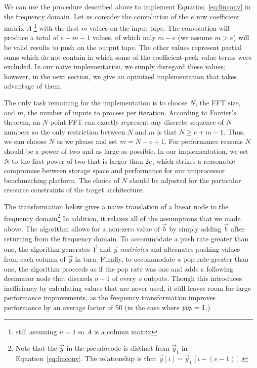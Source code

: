 We can use the procedure described above to implement
Equation~\ref{eq:linconv} in the frequency domain.  Let us consider
the convolution of the $e$ row coefficient matrix $A$
\footnote{still assuming $u=1$ so $A$ is a column matrix} with the
first $m$ values on the input tape. The convolution will produce 
a total of $e+m-1$ values, of which only $m-e$ (we assume $m>e$) 
will be valid results to push on the output tape.
The other values represent partial sums which do not contain
in which some of the coefficient-peek value terms were excluded.
In our naive implementation, we simply disregard these values; 
however, in the next section, we give an optmized implementation 
that takes advantage of them.

The only task remaining for the implementation is to choose $N$, 
the FFT size, and $m$, the number of inputs to process per iteration.
According to Fourier's theorem, an $N$-point FFT can exactly represent 
any discrete sequence of $N$ numbers so the only restriction between $N$ and
$m$ is that $N\ge e+m-1$.
Thus, we can choose $N$ as we please and set $m = N-e+1$.  
For performance reasons $N$ should be a power of two and as large as possible.  
In our implementation, we set $N$ to the first power of two that is 
larger than $2e$, which strikes a reasonable compromise between storage 
space and performance for our uniprocessor benchmarking platform. 
The choice of $N$ should be adjusted for the particular resource 
constraints of the target architecture.

The transformation below gives a naive translation of a linear node to
the frequency domain\footnote{Note that the $\vec{y}$ in the
pseudocode is distinct from $\vec{y}_1$ in Equation~\ref{eq:linconv}.
The relationship is that $\vec{y}[i] = \vec{y}_1\hspace{1pt}[i-(e-1)]$.}  In
addition, it relaxes all of the assumptions that we made above.  The
algorithm allows for a non-zero value of ${\vec b}$ by simply adding
$\vec{b}$ after returning from the frequency domain.  To accommodate
a push rate greater than one, the algorithm generates $\vec{Y}$ and 
$\vec{y}$ {\it matricies} and alternates pushing values from each column 
of $\vec{y}$ in turn.
Finally, to accommodate a pop rate greater than one, the algorithm
proceeds as if the pop rate was one and adds a following decimator node 
that discards $o-1$ of every $o$ outputs. 
Though this introduces inefficiency by calculating values that are
never used, it still leaves room for large performance improvements, 
as the frequency transformation improves performance by an average factor 
of 50 (in the case where $\mbox{\it pop}=1$.)


